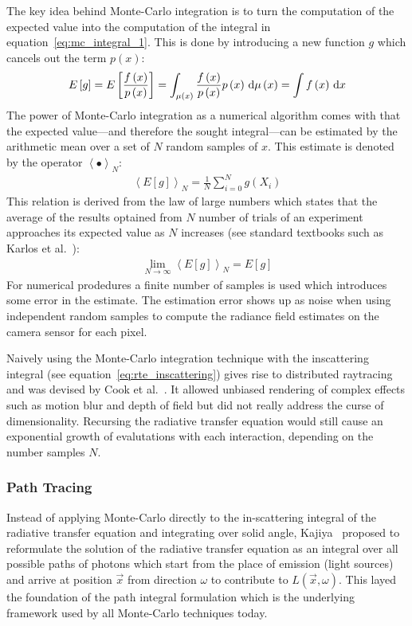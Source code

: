 The key idea behind Monte-Carlo integration is to turn the computation of the expected value into the computation of the integral in equation~\ref{eq:mc_integral_1}. This is done by introducing a new function $g$ which cancels out the term $p\left(x\right)$:
\begin{align}
E\left[g\right]
=E\left[\frac{f\left(x\right)}{p\left(x\right)}\right]
= \int_{\mu\left(x\right)} \frac{f\left(x\right)}{p\left(x\right)}p\left(x\right)\,\mathrm{d}\mu\left(x\right)
=\int f\left(x\right)\,\mathrm{d} x
\end{align}
The power of Monte-Carlo integration as a numerical algorithm comes with that the expected value---and therefore the sought integral---can be estimated by the arithmetic mean over a set of $N$ random samples of $x$. This estimate is denoted by the operator $\left<\bullet\right>_N$:
\begin{align}
\left<E[g]\right>_N = 
\frac{1}{N}\sum_{i=0}^{N}
g\left(X_i\right)
\end{align}
This relation is derived from the law of large numbers which states that the average of the results optained from $N$ number of trials of an experiment approaches its expected value as $N$ increases (see standard textbooks such as Karlos et al.~\cite{Kalos86}):
\begin{align}
\lim_{N\rightarrow\infty} \left<E[g]\right>_N = E[g]
\end{align}
For numerical prodedures a finite number of samples is used which introduces some error in the estimate. The estimation error shows up as noise when using independent random samples to compute the radiance field estimates on the camera sensor for each pixel.

Naively using the Monte-Carlo integration technique with the inscattering integral (see equation~\ref{eq:rte_inscattering}) gives rise to distributed raytracing and was devised by Cook et al.~\cite{Cook84}. It allowed unbiased rendering of complex effects such as motion blur and depth of field but did not really address the curse of dimensionality. Recursing the radiative transfer equation would still cause an exponential growth of evalutations with each interaction, depending on the number samples $N$.


\subsubsection*{Path Tracing}

Instead of applying Monte-Carlo directly to the in-scattering integral of the radiative transfer equation and integrating over solid angle, Kajiya~\cite{Kajiya86} proposed to reformulate the solution of the radiative transfer equation as an integral over all possible paths of photons which start from the place of emission (light sources) and arrive at position $\vec{x}$ from direction $\omega$ to contribute to $L(\vec{x}, \omega)$. This layed the foundation of the path integral formulation which is the underlying framework used by all Monte-Carlo techniques today.

